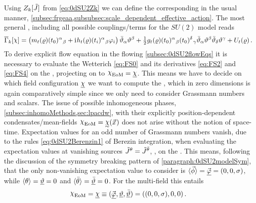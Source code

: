 Using $Z_k[\tilde{J}]$ from \cref{eq:0dSU2Zk} we can define the corresponding \eaa{} in the usual manner, \cf{} \cref{subsec:frgeaa,subsubsec:scale_dependent_effective_action}.
The most general \eaa{}, including all possible couplings/terms for the $SU(2)$ model reads
\begin{align}
	\FSeaa_\FSk[\MFchi]=\del{\MFvtx{m}{\MFrho}\suIItij{0}{\alpha}{\beta}
	+\iu \MFvtx{h}{\MFrho}\suIItij{i}{\alpha}{\beta}\MFphi_i}\MFthetab_\alpha\MFtheta^\beta
	+\tfrac{1}{2}\MFvtx{g}{\MFrho}\suIItij{0}{\alpha}{\beta}\suIItij{0}{\delta}{\gamma}\MFthetab_\alpha\MFtheta^\beta\MFthetab_\delta\MFtheta^\gamma
	+ U_t(\MFrho)\,. \label{eq:0dSU2eaa}
\end{align}
To derive explicit flow equation in the flowing \cref{subsec:0dSU2flowEqs} it is necessary to evaluate the Wetterich \cref{eq:FS0} and its \fs{} derivatives \eqref{eq:FS2} and \eqref{eq:FS4} on the \qeom{}, \viz{} projecting on to $\FSsfEoM{}=\MFEchi{}$.
This means we have to decide on which field configuration $\MFEchi{}$ we want to compute the \eaa{}, which in zero dimensions is again comparatively simple since we only need to consider Grassmann numbers and scalars.
The issue of possible inhomogeneous phases, \cf{} \cref{subsec:inhomoMethods,sec:lpacdw}, with their explicitly position-dependent condensates/mean-fields $\FSsfEoM{}=\MFEIchi{}(\vec{x}\vts)$ does not arise without the notion of space-time. 
Expectation values for an odd number of Grassmann numbers vanish, due to the rules \eqref{eq:0dSU2Berenzin1} of Berezin integration, when evaluating the expectation values at vanishing sources
$\tilde{J}^{\theta}=\tilde{J}^{\bar{\theta}}$, \ie{}, on the \qeom{}. 
This means, following the discussion of the symmetry breaking pattern of \cref{paragraph:0dSU2modelSym}, that the only non-vanishing expectation value to consider is $\langle\vec{\phi}\rangle=\vec{\underline{\varphi}}=(0,0,\sigma)$, while $\langle\theta\rangle=\underline{\vartheta}=0$ and $\langle\bar{\theta}\rangle=\underline{\bar{\vartheta}}=0$. For the multi-field this entails
\begin{align}
\FSsfEoM{}=\MFEchi{}\equiv (\vec{\MFEphi},\MFEtheta,\MFEthetab)=((0,0,\sigma),0,0)\,.
\label{eq:0dSU2VEV}
\end{align}

